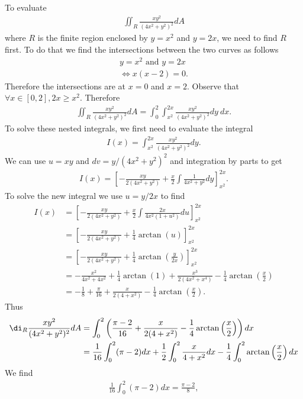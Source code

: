 \documentclass{article}
\begin{document}
To evaluate
\begin{align*}
  \iint_R\frac{xy^2}{(4x^2+y^2)^2}dA
\end{align*}
where $R$ is the finite region enclosed by $y=x^2$ and $y=2x$,
we need to find $R$ first. To do that we find the intersections between the
two curves as follows
\begin{align*}
  y=x^2 \text{ and } y = 2x\\
  \Leftrightarrow x(x-2)=0.
\end{align*}
Therefore the intersections are at $x=0$ and $x=2$. Observe that
$\forall x\in[0,2], 2x\geq x^2$. Therefore
\begin{align*}
  \iint_R \frac{xy^2}{(4x^2+y^2)^2} dA
  = \int_0^2\int_{x^2}^{2x} \frac{xy^2}{(4x^2+y^2)^2}dy\: dx.
\end{align*}
To solve these nested integrals, we first need to evaluate the
 integral
\begin{align*}
  I(x) = \int_{x^2}^{2x} \frac{xy^2}{(4x^2+y^2)^2}dy.
\end{align*}
We can use $u=xy$ and $dv=y/(4x^2+y^2)^2$ and integration by
parts to get
\begin{align*}
  I(x) = \left[-\frac{xy}{2(4x^2+y^2)}+\frac{x}{2}\int \frac{1}{4x^2+y^2}dy\right]_{x^2}^{2x}.
\end{align*}
To solve the new integral we use $u=y/2x$ to find
\begin{align*}
  I(x) &= \left[-\frac{xy}{2(4x^2+y^2)}+\frac{x}{2}\int \frac{2x}{4x^2(1+u^2)}du\right]_{x^2}^{2x}\\
  &= \left[-\frac{xy}{2(4x^2+y^2)}+\frac{1}{4}\arctan(u)\right]_{x^2}^{2x}\\
  &= \left[-\frac{xy}{2(4x^2+y^2)}+\frac{1}{4}\arctan\left(\frac{y}{2x}\right)\right]_{x^2}^{2x}\\
  &=-\frac{x^2}{4x^2+4x^2}+\frac{1}{4}\arctan(1)+\frac{x^3}{2(4x^2+x^4)}
  -\frac{1}{4}\arctan\left(\frac{x}{2}\right)\\
  &=-\frac{1}{8}+\frac{\pi}{16}+\frac{x}{2(4+x^2)}-\frac{1}{4}\arctan\left(\frac{x}{2}\right).
\end{align*}
Thus
\begin{align*}
  \di_R\frac{xy^2}{(4x^2+y^2)^2}dA&=\int_0^2\left(\frac{\pi-2}{16}+\frac{x}{2(4+x^2)}-\frac{1}{4}\arctan\left(\frac{x}{2}\right)\right)dx\\
  &=\frac{1}{16}\int_0^2(\pi-2)dx+\frac{1}{2}\int_0^2\frac{x}{4+x^2}dx-\frac{1}{4}\int_0^2\arctan\left(\frac{x}{2}\right)dx
\end{align*}
We find 
\begin{align*}
  \frac{1}{16}\int_0^2 (\pi-2)dx = \frac{\pi-2}{8},
\end{align*}
\end{document}
